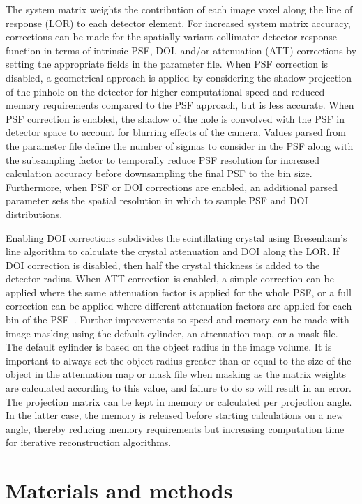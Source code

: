 \documentclass[utf8]{FrontiersinVancouver}
\begin{document}
The system matrix weights the contribution of each image voxel along the line of response (LOR) to each detector element. For increased system matrix accuracy, corrections can be made for the spatially variant collimator-detector response function in terms of intrinsic PSF, DOI, and/or attenuation (ATT) corrections by setting the appropriate fields in the parameter file. When PSF correction is disabled, a geometrical approach is applied by considering the shadow projection of the pinhole on the detector for higher computational speed and reduced memory requirements compared to the PSF approach, but is less accurate. When PSF correction is enabled, the shadow of the hole is convolved with the PSF in detector space to account for blurring effects of the camera. Values parsed from the parameter file define the number of sigmas to consider in the PSF along with the subsampling factor to temporally reduce PSF resolution for increased calculation accuracy before downsampling the final PSF to the bin size. Furthermore, when PSF or DOI corrections are enabled, an additional parsed parameter sets the spatial resolution in which to sample PSF and DOI distributions. 

Enabling DOI corrections subdivides the scintillating crystal using Bresenham's line algorithm to calculate the crystal attenuation and DOI along the LOR. If DOI correction is disabled, then half the crystal thickness is added to the detector radius.  When ATT correction is enabled, a simple correction can be applied where the same attenuation factor is applied for the whole PSF, or a full correction can be applied where different attenuation factors are applied for each bin of the PSF~\citep{marti_fuster_evaluation_2013}. Further improvements to speed and memory can be made with image masking using the default cylinder, an attenuation map, or a mask file. The default cylinder is based on the object radius in the image volume. It is important to always set the object radius greater than or equal to the size of the object in the attenuation map or mask file when masking as the matrix weights are calculated according to this value, and failure to do so will result in an error. The projection matrix can be kept in memory or calculated per projection angle. In the latter case, the memory is released before starting calculations on a new angle, thereby reducing memory requirements but increasing computation time for iterative reconstruction algorithms.

\section{Materials and methods}
\end{document}
